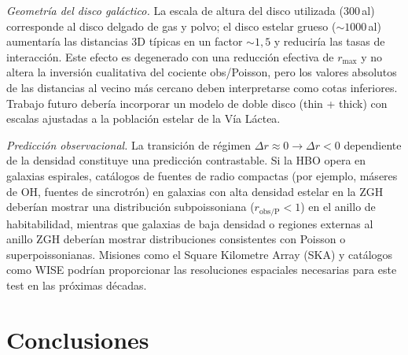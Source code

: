 \documentclass[11pt,a4paper,onecolumn]{article}
\begin{document}
\textit{Geometría del disco galáctico.}
La escala de altura del disco utilizada (300\,al) corresponde al disco
delgado de gas y polvo; el disco estelar grueso ($\sim 1000$\,al)
aumentaría las distancias 3D típicas en un factor $\sim 1{,}5$ y
reduciría las tasas de interacción.
Este efecto es degenerado con una reducción efectiva de $r_\text{max}$
y no altera la inversión cualitativa del cociente obs/Poisson, pero
los valores absolutos de las distancias al vecino más cercano deben
interpretarse como cotas inferiores.
Trabajo futuro debería incorporar un modelo de doble disco (thin + thick)
con escalas ajustadas a la población estelar de la Vía Láctea.

\textit{Predicción observacional.}
La transición de régimen $\Delta r \approx 0 \to \Delta r < 0$ dependiente
de la densidad constituye una predicción contrastable.
Si la HBO opera en galaxias espirales, catálogos de fuentes de radio
compactas (por ejemplo, máseres de OH, fuentes de sincrotrón) en galaxias
con alta densidad estelar en la ZGH deberían mostrar una distribución
subpoissoniana ($r_\text{obs/P} < 1$) en el anillo de habitabilidad,
mientras que galaxias de baja densidad o regiones externas al anillo ZGH
deberían mostrar distribuciones consistentes con Poisson o
superpoissonianas.
Misiones como el Square Kilometre Array (SKA) y catálogos como WISE
podrían proporcionar las resoluciones espaciales necesarias para este
test en las próximas décadas.

\section{Conclusiones}
\label{sec:conclusions}
\end{document}
